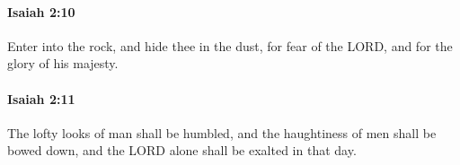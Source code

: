 		\paragraph{Isaiah 2:10} %
			\label{ISAIAH-2-10}

			Enter into the rock, and hide thee in the dust, for fear of the LORD, and for the glory of his majesty.


		\paragraph{Isaiah 2:11} %
			\label{ISAIAH-2-11}

			The lofty looks of man shall be humbled, and the haughtiness of men shall be bowed down, and the LORD alone shall be exalted in that day.


